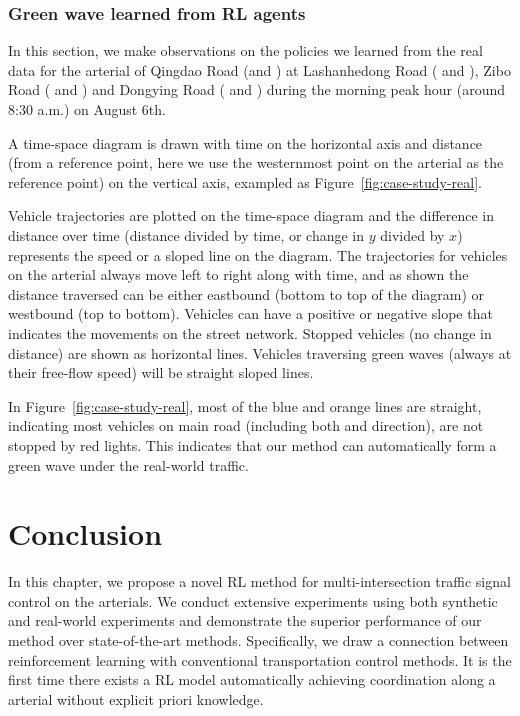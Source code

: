 \subsubsection{Green wave learned from RL agents}
In this section,
we make observations on the policies we learned from the real
data for the arterial of Qingdao Road (\WE and \EW ) at Lashanhedong Road ( and ), Zibo Road ( and ) and Dongying Road ( and ) during the morning peak hour (around 8:30 a.m.) on August 6th. 


A time-space diagram is drawn with time on the horizontal axis and distance (from a reference point, here we use the westernmost point on the arterial as the reference point) on the vertical axis, exampled as Figure~\ref{fig:case-study-real}. 

Vehicle trajectories are plotted on the time-space diagram and the difference in distance over time (distance divided by time, or change in $y$ divided by $x$) represents the speed or a sloped line on the diagram. The trajectories for vehicles on the arterial always move left to right along with time, and as shown the distance traversed can be either eastbound (bottom to top of the diagram) or westbound (top to bottom). Vehicles can have a positive or negative slope that indicates the movements on the street network. Stopped vehicles (no change in distance) are shown as horizontal lines. Vehicles traversing green waves (always at their free-flow speed) will be straight sloped lines.

In Figure~\ref{fig:case-study-real}, most of the blue and orange lines are straight, indicating most vehicles on main road (including both \WE and \EW direction), are not stopped by red lights. This indicates that our method can automatically form a green wave under the real-world traffic.


\section{Conclusion}
In this chapter, we propose a novel RL method for multi-intersection traffic signal control on the arterials. We conduct extensive experiments using both synthetic and real-world experiments and demonstrate the superior performance of our method over state-of-the-art methods. Specifically, we draw a connection between reinforcement learning with conventional transportation control methods. It is the first time there exists a RL model automatically achieving coordination along a arterial without explicit priori knowledge. 
 
